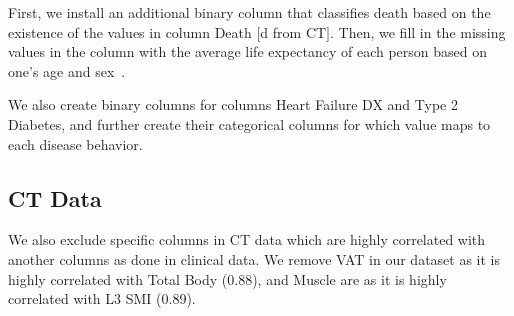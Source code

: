 First, we install an additional binary column that classifies death based on the existence of the values in column Death $[$d from CT$]$.
Then, we fill in the missing values in the column with the average life expectancy of each person based on one's age and sex~\cite{lifetable}.

We also create binary columns for columns Heart Failure DX and Type 2 Diabetes, and further create their categorical columns for which value maps to each disease behavior.


\subsection{CT Data}

We also exclude specific columns in CT data which are highly correlated with another columns as done in clinical data.
We remove VAT in our dataset as it is highly correlated with Total Body (0.88), and Muscle are as it is highly correlated with L3 SMI (0.89).


